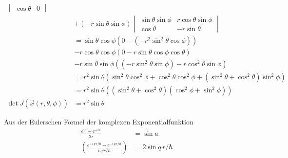 \documentclass[11pt,a4paper]{scrartcl}
\begin{document}
\begin{tcolorbox}[title=Nebenrechnung Volumenselement, breakable]
\begin{align*}
\begin{vmatrix}
            \cos{\theta} & 0
        \end{vmatrix} \\
        &+ (-r \sin{\theta} \sin{\phi}) \begin{vmatrix}
            \sin{\theta} \sin{\phi} & r \cos{\theta} \sin{\phi}\\
            \cos{\theta} & - r \sin{\theta}
        \end{vmatrix}\\
        &=\sin{\theta} \cos{\phi} (0 - (-r^2 \sin^2{\theta} \cos{\phi}))\\
        &- r \cos{\theta} \cos{\phi} (0 - r \sin{\theta} \cos{\phi} \cos{\theta}) \\
        &- r \sin{\theta} \sin{\phi} ((-r \sin^2{\theta} \sin{\phi}) - r \cos^2{\theta} \sin{\phi})\\
        &= r^2 \sin{\theta}(
            \sin^2{\theta} \cos^2{\phi}
            + \cos^2{\theta} \cos^2{\phi}
            + (\sin^2{\theta} + \cos^2{\theta}) \sin^2{\phi}
        )\\
        &= r^2\sin{\theta}((\sin^2{\theta} + \cos^2{\theta}) (\cos^2{\phi} + \sin^2{\phi}))\\
        \det{J(\vec{x}(r,\theta, \phi))} &= r^2\sin{\theta}
    \end{align*}
\end{tcolorbox}
\begin{tcolorbox}[title=Trigonometrischer Zusammenhang mit der komplexen Exponentialfunktion, breakable]
    Aus der Eulerschen Formel der komplexen Exponentialfunktion
    \begin{align*}
         \frac{e^{ia}-e^{-ia}}{2i} &= \sin{a}  \\
        \left(\frac{e^{+i \, q \, r/\hbar} - e^{-i \, q \, r/\hbar}}{i \, q \, r/\hbar}\right) &= 2 \sin{q\,r / \hbar}
    \end{align*}
\end{tcolorbox}
\end{document}
